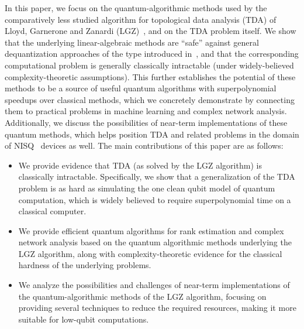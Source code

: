 \documentclass[a4paper, onecolumn, accepted=2022-08-28]{quantumarticle}
\begin{document}
In this paper, we focus on the quantum-algorithmic methods used by the comparatively less studied algorithm for topological data analysis (TDA) of Lloyd, Garnerone and Zanardi (LGZ)~\cite{lloyd:lgz_algorithm}, and on the TDA problem itself.
We show that the underlying linear-algebraic methods are ``safe'' against general dequantization approaches of the type introduced in~\cite{tang:dequantization, chia:dequantizations}, and that the corresponding computational problem is generally classically intractable (under widely-believed complexity-theoretic assumptions).
This further establishes the potential of these methods to be a source of useful quantum algorithms with superpolynomial speedups over classical methods, which we concretely demonstrate by connecting them to practical problems in machine learning and complex network analysis.
Additionally, we discuss the possibilities of near-term implementations of these quantum methods, which helps position TDA and related problems in the domain of NISQ~\cite{preskill:nisq} devices as well.
The main contributions of this paper are as follows:
\vspace{-3pt}
\begin{itemize}[leftmargin=7pt, itemsep=0.5pt]
\item We provide evidence that TDA (as solved by the LGZ algorithm) is classically intractable. Specifically, we show that a generalization of the TDA problem is as hard as simulating the one clean qubit model of quantum computation, which is widely believed to require superpolynomial time on a classical computer.
\item We provide efficient quantum algorithms for rank estimation and complex network analysis based on the quantum algorithmic methods underlying the LGZ algorithm, along with complexity-theoretic evidence for the classical hardness of the underlying problems.
\item We analyze the possibilities and challenges of near-term implementations of the quantum-algorithmic methods of the LGZ algorithm, focusing on providing several techniques to reduce the required resources, making it more suitable for low-qubit computations. 
\end{itemize} 
\end{document}
